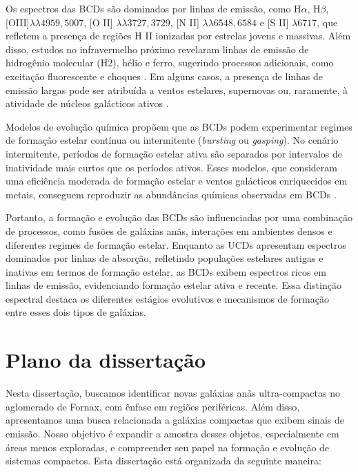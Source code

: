 Os espectros das BCDs são dominados por linhas de emissão, como H$\alpha$, H$\beta$, [OIII]$\lambda \lambda 4959,5007$, [O II] $\lambda \lambda 3727,3729$, [N II] $\lambda \lambda 6548, 6584$ e [S II] $\lambda 6717$, que refletem a presença de regiões H II ionizadas por estrelas jovens e massivas. Além disso, estudos no infravermelho próximo revelaram linhas de emissão de hidrogênio molecular (H$2$), hélio e ferro, sugerindo processos adicionais, como excitação fluorescente e choques \citep{Izotov_2011}. Em alguns casos, a presença de linhas de emissão largas pode ser atribuída a ventos estelares, supernovas ou, raramente, à atividade de núcleos galácticos ativos \citep{Izotov_2007}.

Modelos de evolução química propõem que as BCDs podem experimentar regimes de formação estelar contínua ou intermitente (\textit{bursting} ou \textit{gasping}). No cenário intermitente, períodos de formação estelar ativa são separados por intervalos de inatividade mais curtos que os períodos ativos. Esses modelos, que consideram uma eficiência moderada de formação estelar e ventos galácticos enriquecidos em metais, conseguem reproduzir as abundâncias químicas observadas em BCDs \citep{Yin_2011}.

Portanto, a formação e evolução das BCDs são influenciadas por uma combinação de processos, como fusões de galáxias anãs, interações em ambientes densos e diferentes regimes de formação estelar. Enquanto as UCDs apresentam espectros dominados por linhas de absorção, refletindo populações estelares antigas e inativas em termos de formação estelar, as BCDs exibem espectros ricos em linhas de emissão, evidenciando formação estelar ativa e recente. Essa distinção espectral destaca os diferentes estágios evolutivos e mecanismos de formação entre esses dois tipos de galáxias.

\section{Plano da dissertação}\label{sec:plano_dissertacao}\label{sec:plano_dissertacao}
Nesta dissertação, buscamos identificar novas galáxias anãs ultra-compactas no aglomerado de Fornax, com ênfase em regiões periféricas. Além disso, apresentamos uma busca relacionada a galáxias compactas que exibem sinais de emissão. Nosso objetivo é expandir a amostra desses objetos, especialmente em áreas menos exploradas, e compreender seu papel na formação e evolução de sistemas compactos. Esta dissertação está organizada da seguinte maneira:

